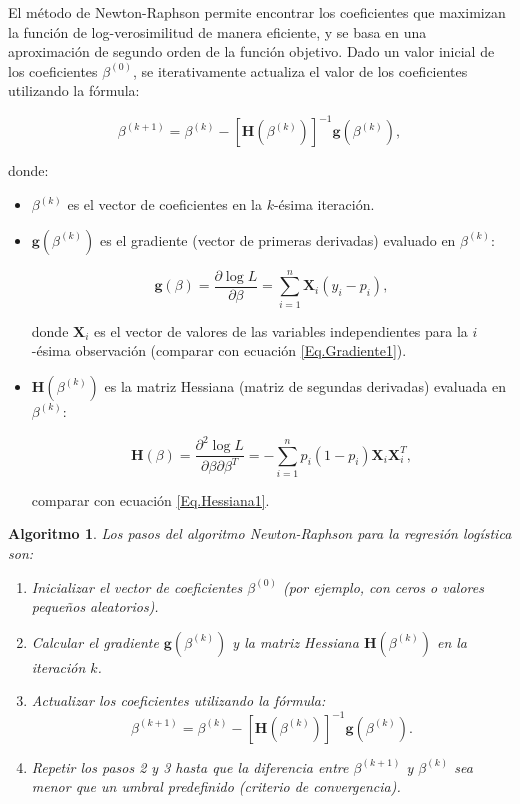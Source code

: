 \documentclass[12pt]{article}
\newtheorem{Algthm}{Algoritmo}
\begin{document}
El método de Newton-Raphson permite encontrar los coeficientes que maximizan la función de log-verosimilitud de manera eficiente, y se basa en una aproximación de segundo orden de la función objetivo. Dado un valor inicial de los coeficientes $\beta^{(0)}$, se iterativamente actualiza el valor de los coeficientes utilizando la fórmula:

\begin{equation}\label{Eq.Criterio1.5}
\beta^{(k+1)} = \beta^{(k)} - \left[ \mathbf{H}(\beta^{(k)}) \right]^{-1} \mathbf{g}(\beta^{(k)}),
\end{equation}

donde:

\begin{itemize}
\item $\beta^{(k)}$ es el vector de coeficientes en la $k$-ésima iteración.
\item $\mathbf{g}(\beta^{(k)})$ es el gradiente (vector de primeras derivadas) evaluado en $\beta^{(k)}$:

\begin{equation}\label{Eq.Gradiente2}
\mathbf{g}(\beta) = \frac{\partial \log L}{\partial \beta} = \sum_{i=1}^{n} \mathbf{X}_i (y_i - p_i),
\end{equation}

donde $\mathbf{X}_i$ es el vector de valores de las variables independientes para la $i$-ésima observación (comparar con ecuaci\'on \ref{Eq.Gradiente1}).

\item $\mathbf{H}(\beta^{(k)})$ es la matriz Hessiana (matriz de segundas derivadas) evaluada en $\beta^{(k)}$:

\begin{equation}\label{Eq.Hessiana2}
\mathbf{H}(\beta) = \frac{\partial^2 \log L}{\partial \beta \partial \beta^T} = -\sum_{i=1}^{n} p_i (1 - p_i) \mathbf{X}_i \mathbf{X}_i^T,
\end{equation}

comparar con ecuaci\'on \ref{Eq.Hessiana1}.
\end{itemize}

\begin{Algthm} \label{Algoritmo2}
Los pasos del algoritmo Newton-Raphson para la regresión logística son:
\begin{enumerate}
\item Inicializar el vector de coeficientes $\beta^{(0)}$ (por ejemplo, con ceros o valores pequeños aleatorios).
\item Calcular el gradiente $\mathbf{g}(\beta^{(k)})$ y la matriz Hessiana $\mathbf{H}(\beta^{(k)})$ en la iteración $k$.
\item Actualizar los coeficientes utilizando la fórmula:
\begin{equation}\label{Eq.Criterio2}
\beta^{(k+1)} = \beta^{(k)} - \left[ \mathbf{H}(\beta^{(k)}) \right]^{-1} \mathbf{g}(\beta^{(k)}).
\end{equation}
\item Repetir los pasos 2 y 3 hasta que la diferencia entre $\beta^{(k+1)}$ y $\beta^{(k)}$ sea menor que un umbral predefinido (criterio de convergencia).
\end{enumerate}
\end{Algthm}
\end{document}
